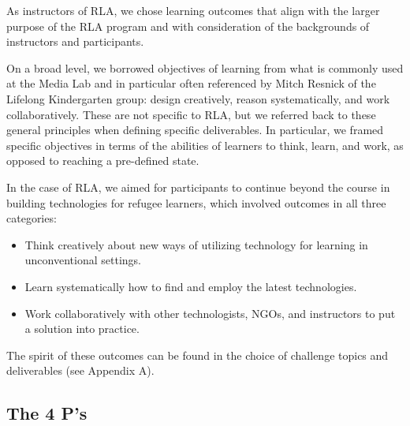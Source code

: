 \documentclass[12pt,twoside]{mitthesis}
\begin{document}
As instructors of RLA, we chose learning outcomes that align with the larger purpose of the RLA program and with consideration of the backgrounds of instructors and participants. 

On a broad level, we borrowed objectives of learning from what is commonly used at the Media Lab and in particular often referenced by Mitch Resnick of the Lifelong Kindergarten group: design creatively, reason systematically, and work collaboratively. These are not specific to RLA, but we referred back to these general principles when defining specific deliverables. In particular, we framed specific objectives in terms of the abilities of learners to think, learn, and work, as opposed to reaching a pre-defined state.~\cite{roleofmaking}

In the case of RLA, we aimed for participants to continue beyond the course in building technologies for refugee learners, which involved outcomes in all three categories:
\begin{itemize}
\item Think creatively about new ways of utilizing technology for learning in unconventional settings.
\item Learn systematically how to find and employ the latest technologies.
\item Work collaboratively with other technologists, NGOs, and instructors to put a solution into practice.
\end{itemize}
The spirit of these outcomes can be found in the choice of challenge topics and deliverables (see Appendix A).

\subsection{The 4 P's}
\end{document}
